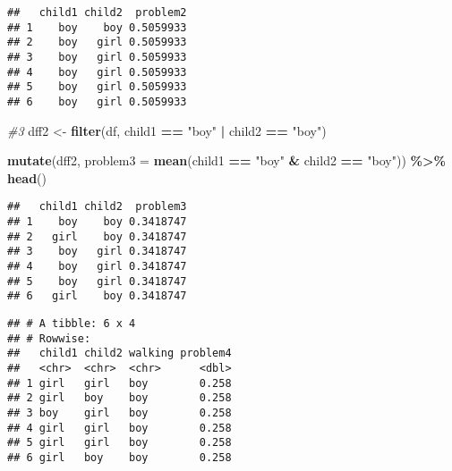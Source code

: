 \documentclass[
]{article}
\newenvironment{Shaded}{\begin{snugshade}}{\end{snugshade}}
\newcommand{\AttributeTok}[1]{\textcolor[rgb]{0.13,0.29,0.53}{#1}}
\newcommand{\CommentTok}[1]{\textcolor[rgb]{0.56,0.35,0.01}{\textit{#1}}}
\newcommand{\ConstantTok}[1]{\textcolor[rgb]{0.56,0.35,0.01}{#1}}
\newcommand{\DecValTok}[1]{\textcolor[rgb]{0.00,0.00,0.81}{#1}}
\newcommand{\FunctionTok}[1]{\textcolor[rgb]{0.13,0.29,0.53}{\textbf{#1}}}
\newcommand{\NormalTok}[1]{#1}
\newcommand{\OtherTok}[1]{\textcolor[rgb]{0.56,0.35,0.01}{#1}}
\newcommand{\SpecialCharTok}[1]{\textcolor[rgb]{0.81,0.36,0.00}{\textbf{#1}}}
\newcommand{\StringTok}[1]{\textcolor[rgb]{0.31,0.60,0.02}{#1}}
\begin{document}
\begin{verbatim}
##   child1 child2  problem2
## 1    boy    boy 0.5059933
## 2    boy   girl 0.5059933
## 3    boy   girl 0.5059933
## 4    boy   girl 0.5059933
## 5    boy   girl 0.5059933
## 6    boy   girl 0.5059933
\end{verbatim}

\begin{Shaded}
\begin{Highlighting}[]
\CommentTok{\#3}
\NormalTok{dff2 }\OtherTok{\textless{}{-}} \FunctionTok{filter}\NormalTok{(df, child1 }\SpecialCharTok{==} \StringTok{"boy"} \SpecialCharTok{|}\NormalTok{ child2 }\SpecialCharTok{==} \StringTok{"boy"}\NormalTok{)}

\FunctionTok{mutate}\NormalTok{(dff2, }\AttributeTok{problem3 =} \FunctionTok{mean}\NormalTok{(child1 }\SpecialCharTok{==} \StringTok{"boy"} \SpecialCharTok{\&}\NormalTok{ child2 }\SpecialCharTok{==} \StringTok{"boy"}\NormalTok{)) }\SpecialCharTok{\%\textgreater{}\%} \FunctionTok{head}\NormalTok{()}
\end{Highlighting}
\end{Shaded}

\begin{verbatim}
##   child1 child2  problem3
## 1    boy    boy 0.3418747
## 2   girl    boy 0.3418747
## 3    boy   girl 0.3418747
## 4    boy   girl 0.3418747
## 5    boy   girl 0.3418747
## 6   girl    boy 0.3418747
\end{verbatim}

\begin{Shaded}
\end{Shaded}

\begin{verbatim}
## # A tibble: 6 x 4
## # Rowwise: 
##   child1 child2 walking problem4
##   <chr>  <chr>  <chr>      <dbl>
## 1 girl   girl   boy        0.258
## 2 girl   boy    boy        0.258
## 3 boy    girl   boy        0.258
## 4 girl   girl   boy        0.258
## 5 girl   girl   boy        0.258
## 6 girl   boy    boy        0.258
\end{verbatim}
\end{document}
